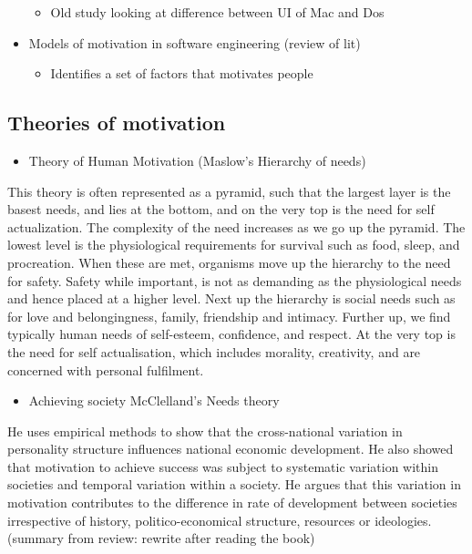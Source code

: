 \documentclass[conference]{IEEEtran}
\begin{document}
\begin{itemize}
  \begin{itemize}
  \item
    Old study looking at difference between UI of Mac and Dos
  \end{itemize}
\item
  Models of motivation in software engineering\cite{sharp2009models}
  (review of lit)

  \begin{itemize}
  \item
    Identifies a set of factors that motivates people
  \end{itemize}
\end{itemize}

\subsection{Theories of motivation}

\begin{itemize}
\item
  Theory of Human Motivation (Maslow's Hierarchy of needs)
  \cite{maslow1943theory}
\end{itemize}

This theory is often represented as a pyramid, such that the largest
layer is the basest needs, and lies at the bottom, and on the very top
is the need for self actualization. The complexity of the need increases
as we go up the pyramid. The lowest level is the physiological
requirements for survival such as food, sleep, and procreation. When
these are met, organisms move up the hierarchy to the need for safety.
Safety while important, is not as demanding as the physiological needs
and hence placed at a higher level. Next up the hierarchy is social
needs such as for love and belongingness, family, friendship and
intimacy. Further up, we find typically human needs of self-esteem,
confidence, and respect. At the very top is the need for self
actualisation, which includes morality, creativity, and are concerned
with personal fulfilment.

\begin{itemize}
\item
  Achieving society\cite{mcclelland1967achieving} McClelland's Needs
  theory
\end{itemize}

He uses empirical methods to show that the cross-national variation in
personality structure influences national economic development. He also
showed that motivation to achieve success was subject to systematic
variation within societies and temporal variation within a society. He
argues that this variation in motivation contributes to the difference
in rate of development between societies irrespective of history,
politico-economical structure, resources or ideologies. (summary from
review: rewrite after reading the book)
\end{document}
